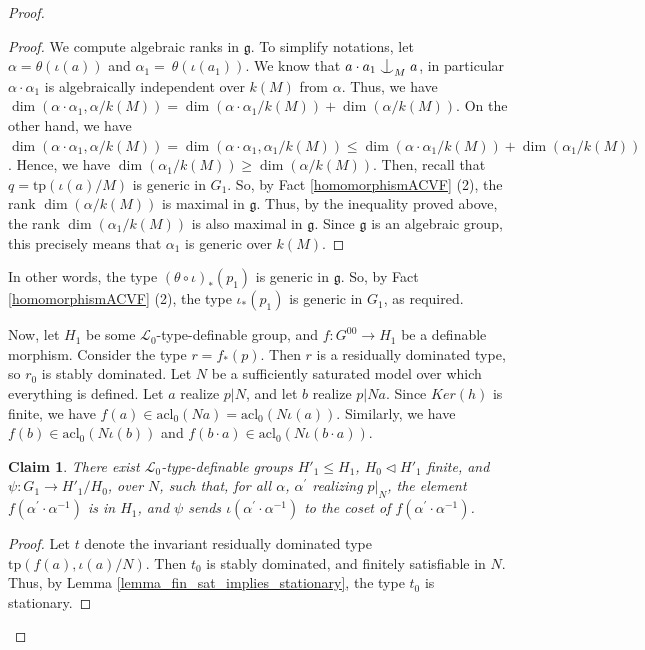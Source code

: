 \documentclass[12pt]{article}
\newcommand{\tpp}{\mathrm{tp}}
\newcommand{\acl}{\mathrm{acl}}
\newcommand{\0}{\emptyset}
\def\forkindep{\mathrel{\raise0.2ex\hbox{\ooalign{\hidewidth$\vert$\hidewidth\cr\raise-0.9ex\hbox{$\smile$}}}}}
\theoremstyle{plain}%
\newtheorem{claim}{Claim}
\theoremstyle{definition}
\theoremstyle{remark}
\begin{document}
\begin{proof}
    \begin{proof}
        We compute algebraic ranks in $\mathfrak{g}$.  To simplify notations, let $\alpha = \theta(\iota(a))$ and $\alpha_1=~\theta(\iota(a_1))$. We know that $a \cdot a_1 \forkindep_M a$, in particular $\alpha \cdot \alpha_1$ is algebraically independent over $k(M)$ from $\alpha$. Thus, we have $\dim(\alpha \cdot \alpha_1, \alpha / k(M)) = \dim(\alpha \cdot \alpha_1/ k(M)) + \dim(\alpha / k(M))$. On the other hand, we have $\dim(\alpha \cdot \alpha_1, \alpha / k(M)) = \dim(\alpha \cdot \alpha_1, \alpha_1 / k(M)) \leq \dim(\alpha \cdot \alpha_1/ k(M)) + \dim(\alpha_1 / k(M))$. Hence, we have $\dim(\alpha_1 / k(M)) \geq \dim(\alpha / k(M))$. Then, recall that $q = \tpp(\iota(a)/M)$ is generic in $G_1$. So, by Fact \ref{homomorphismACVF} (2), the rank $\dim(\alpha / k(M))$ is maximal in $\mathfrak{g}$. Thus, by the inequality proved above, the rank $\dim(\alpha_1 / k(M))$ is also maximal in $\mathfrak{g}$. Since $\mathfrak{g}$ is an algebraic group, this precisely means that $\alpha_1$ is generic over $k(M)$. 
       
    \end{proof}

In other words, the type $(\theta \circ \iota)_*(p_1)$ is generic in $\mathfrak{g}$. So, by Fact \ref{homomorphismACVF} (2), the type $\iota_*(p_1)$ is generic in $G_1$, as required.
    
Now, let $H_1$ be some $\mathcal{L}_0$-type-definable group, and $f: G^{00} \rightarrow H_1$ be a definable morphism. Consider the type $r= f_*(p)$. Then $r$ is a residually dominated type, so $r_0$ is stably dominated. Let $N$ be a sufficiently saturated model over which everything is defined. Let $a$ realize $p|N$, and let $b$ realize $p|{Na}$. %
Since $Ker(h)$ is finite, we have $f(a) \in \acl_0(Na) = \acl_0(N\iota(a))$. Similarly, we have $f(b) \in \acl_0(N\iota(b))$ and $f(b \cdot a) \in \acl_0(N \iota(b \cdot a))$.


\begin{claim}
    There exist $\mathcal{L}_0$-type-definable groups $H'_1 \leq H_1$, $H_0 \lhd H'_1$ finite, and $\psi: G_1 \rightarrow H'_1 / H_0$, over $N$, such that, for all $\alpha$, $\alpha^{'}$ realizing $p|_N$, the element $f(\alpha^{'} \cdot \alpha^{-1})$ is in $H_1$, and $\psi$ sends $\iota(\alpha^{'} \cdot \alpha^{-1})$ to the coset of $f(\alpha^{'} \cdot \alpha^{-1})$.
\end{claim}
\begin{proof}
    Let $t$ denote the invariant
    residually dominated type $\tpp(f(a), \iota(a) / N)$. Then $t_0$ is stably dominated, and finitely satisfiable in $N$. Thus, by Lemma \ref{lemma_fin_sat_implies_stationary}, the type $t_0$ is stationary. 


\end{proof}
\end{proof}
\end{document}
